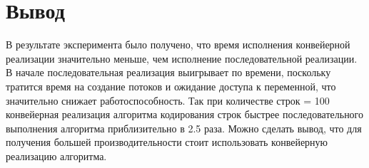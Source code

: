 \clearpage


\section*{Вывод}

В результате эксперимента было получено, что время исполнения конвейерной реализации значительно меньше, чем исполнение последовательной реализации. В начале последовательная реализация выигрывает по времени, поскольку тратится время на создание потоков и ожидание доступа к переменной, что значительно снижает работоспособность. Так при количестве строк = 100 конвейерная реализация алгоритма кодирования строк быстрее последовательного выполнения алгоритма приблизительно в 2.5 раза.  
Можно сделать вывод, что для получения большей производительности стоит использовать конвейерную реализацию алгоритма.